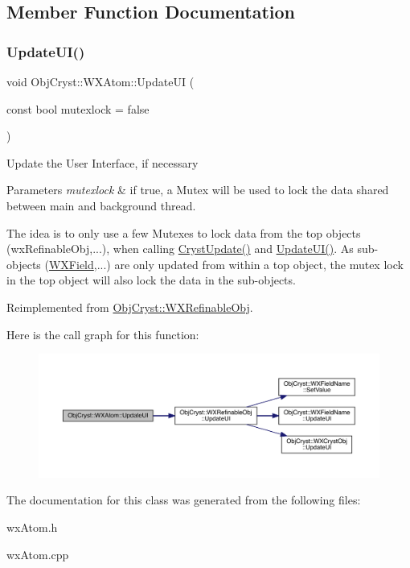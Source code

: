 \subsection{Member Function Documentation}
\mbox{\label{class_obj_cryst_1_1_w_x_atom_a09c1212622fe6bb17ca8443455370551}} 
\subsubsection{\texorpdfstring{UpdateUI()}{UpdateUI()}}
{\footnotesize\ttfamily void Obj\+Cryst\+::\+W\+X\+Atom\+::\+Update\+UI (\begin{DoxyParamCaption}\item[{const bool}]{mutexlock = {\ttfamily false} }\end{DoxyParamCaption})\hspace{0.3cm}{\ttfamily [virtual]}}

Update the User Interface, if necessary


\begin{DoxyParams}{Parameters}
{\em mutexlock} & if true, a Mutex will be used to lock the data shared between main and background thread.\\
\hline
\end{DoxyParams}
The idea is to only use a few Mutexes to lock data from the top objects (wx\+Refinable\+Obj,...), when calling \mbox{\hyperlink{class_obj_cryst_1_1_w_x_refinable_obj_a8249d288e62ad1ebffeea91f77ae37a3}{Cryst\+Update()}} and \mbox{\hyperlink{class_obj_cryst_1_1_w_x_atom_a09c1212622fe6bb17ca8443455370551}{Update\+U\+I()}}. As sub-\/objects (\mbox{\hyperlink{class_obj_cryst_1_1_w_x_field}{W\+X\+Field}},...) are only updated from within a top object, the mutex lock in the top object will also lock the data in the sub-\/objects. 

Reimplemented from \mbox{\hyperlink{class_obj_cryst_1_1_w_x_refinable_obj_acbf70975a79661a73a1ae3c39c9c3045}{Obj\+Cryst\+::\+W\+X\+Refinable\+Obj}}.

Here is the call graph for this function\+:
\nopagebreak
\begin{figure}[H]
\begin{center}
\leavevmode
\includegraphics[width=350pt]{class_obj_cryst_1_1_w_x_atom_a09c1212622fe6bb17ca8443455370551_cgraph}
\end{center}
\end{figure}


The documentation for this class was generated from the following files\+:\begin{DoxyCompactItemize}
\item 
wx\+Atom.\+h\item 
wx\+Atom.\+cpp\end{DoxyCompactItemize}
